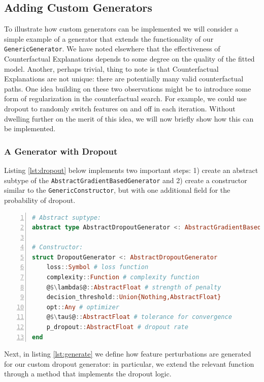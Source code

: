 \documentclass{juliacon}
\begin{document}
\hypertarget{sec-custom-gen}{%
\subsection{Adding Custom Generators}\label{sec-custom-gen}}

To illustrate how custom generators can be implemented we will consider
a simple example of a generator that extends the functionality of our
\texttt{GenericGenerator}. We have noted elsewhere that the
effectiveness of Counterfactual Explanations depends to some degree on
the quality of the fitted model. Another, perhaps trivial, thing to note
is that Counterfactual Explanations are not unique: there are
potentially many valid counterfactual paths. One idea building on these
two observations might be to introduce some form of regularization in
the counterfactual search. For example, we could use dropout to randomly
switch features on and off in each iteration. Without dwelling further
on the merit of this idea, we will now briefly show how this can be
implemented.

\hypertarget{a-generator-with-dropout}{%
\subsubsection{A Generator with
Dropout}\label{a-generator-with-dropout}}

Listing \ref{lst:dropout} below implements two important steps: 1)
create an abstract subtype of the
\texttt{AbstractGradientBasedGenerator} and 2) create a constructor
similar to the \texttt{GenericConstructor}, but with one additional
field for the probability of dropout.

\begin{lstlisting}[language=Julia, escapechar=@, numbers=left, label={lst:dropout}, caption={}]
# Abstract suptype:
abstract type AbstractDropoutGenerator <: AbstractGradientBasedGenerator end

# Constructor:
struct DropoutGenerator <: AbstractDropoutGenerator
    loss::Symbol # loss function
    complexity::Function # complexity function
    @$\lambda$@::AbstractFloat # strength of penalty
    decision_threshold::Union{Nothing,AbstractFloat} 
    opt::Any # optimizer
    @$\tau$@::AbstractFloat # tolerance for convergence
    p_dropout::AbstractFloat # dropout rate
end
\end{lstlisting}

Next, in listing \ref{lst:generate} we define how feature perturbations
are generated for our custom dropout generator: in particular, we extend
the relevant function through a method that implements the dropout
logic.
\end{document}
